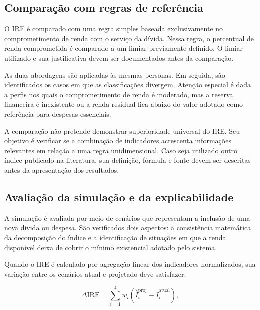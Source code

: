 \documentclass[portuguese]{sbc2025}%
\begin{document}
\subsection{Comparação com regras de referência}
\label{sec:aval-baseline}

O IRE é comparado com uma regra simples baseada exclusivamente no
comprometimento de renda com o serviço da dívida. Nessa regra, o
percentual de renda comprometida é comparado a um limiar previamente
definido. O limiar utilizado e sua justificativa devem ser documentados
antes da comparação.

As duas abordagens são aplicadas às mesmas personas. Em seguida,
são identificados os casos em que as classificações divergem. Atenção
especial é dada a perfis nos quais o comprometimento de renda é
moderado, mas a reserva financeira é inexistente ou a renda residual
fica abaixo do valor adotado como referência para despesas essenciais.

A comparação não pretende demonstrar superioridade universal do IRE.
Seu objetivo é verificar se a combinação de indicadores acrescenta
informações relevantes em relação a uma regra unidimensional. Caso
seja utilizado outro índice publicado na literatura, sua definição,
fórmula e fonte devem ser descritas antes da apresentação dos resultados.

\subsection{Avaliação da simulação e da explicabilidade}
\label{sec:aval-simulacao}

A simulação é avaliada por meio de cenários que representam a inclusão
de uma nova dívida ou despesa. São verificados dois aspectos: a
consistência matemática da decomposição do índice e a identificação
de situações em que a renda disponível deixa de cobrir o mínimo
existencial adotado pelo sistema.

Quando o IRE é calculado por agregação linear dos indicadores
normalizados, sua variação entre os cenários atual e projetado deve
satisfazer:

\begin{equation}
\Delta \mathrm{IRE} =
\sum_{i=1}^{4}
w_i\left(
\hat{I}_i^{\mathrm{proj}} -
\hat{I}_i^{\mathrm{atual}}
\right),
\label{eq:decomposicao}
\end{equation}
\end{document}
